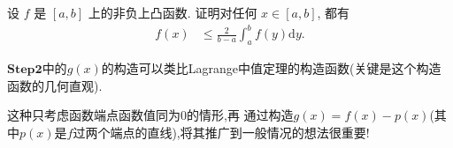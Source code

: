 \documentclass[../../main.tex]{subfiles}
\begin{document}
\begin{proposition}\label{proposition:凸函数相关积分不等式11111}
设 $f$ 是 $[a,b]$ 上的非负上凸函数. 证明对任何 $x \in [a,b]$, 都有
\begin{align}\label{equation-凸性相关积分-16.40}
f(x) &\leqslant \frac{2}{b - a}\int_{a}^{b}f(y)\mathrm{d}y.
\end{align} 
\end{proposition}
\begin{remark}
$\mathbf{Step}\mathbf{2}$中的$g(x)$的构造可以类比Lagrange中值定理的构造函数(关键是这个构造函数的几何直观).
\end{remark}
\begin{note}
这种只考虑函数端点函数值同为0的情形,再
通过构造$g(x)=f(x)-p(x)$(其中$p(x)$是$f$过两个端点的直线),将其推广到一般情况的想法很重要!
\end{note}
\end{document}
